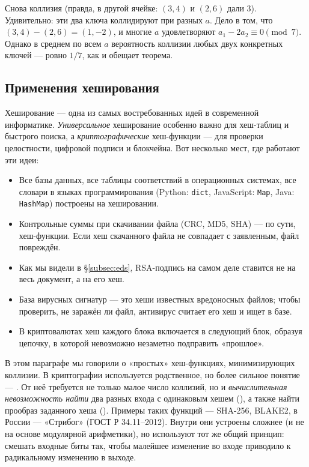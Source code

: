 Снова коллизия (правда, в другой ячейке: $(3,4)$ и $(2,6)$ дали $3$). Удивительно: эти два ключа коллидируют при разных $a$. Дело в том, что $(3, 4) - (2, 6) = (1, -2)$, и многие $a$ удовлетворяют $a_1 - 2 a_2 \equiv 0 \pmod 7$. Однако в среднем по всем $a$ вероятность коллизии любых двух конкретных ключей --- ровно $1/7$, как и обещает теорема.

\subsection{Применения хеширования}

Хеширование --- одна из самых востребованных идей в современной информатике. \emph{Универсальное} хеширование особенно важно для хеш-таблиц и быстрого поиска, а \emph{криптографические} хеш-функции --- для проверки целостности, цифровой подписи и блокчейна. Вот несколько мест, где работают эти идеи:

\begin{itemize}
  \item {} Все базы данных, все таблицы соответствий в операционных системах, все словари в языках программирования (Python: \texttt{dict}, JavaScript: \texttt{Map}, Java: \texttt{HashMap}) построены на хешировании.
  \item {} Контрольные суммы при скачивании файла (CRC, MD5, SHA) --- по сути, хеш-функции. Если хеш скачанного файла не совпадает с заявленным, файл повреждён.
  \item {} Как мы видели в §\ref{subsec:eds}, RSA-подпись на самом деле ставится не на весь документ, а на его хеш.
  \item {} База вирусных сигнатур --- это хеши известных вредоносных файлов; чтобы проверить, не заражён ли файл, антивирус считает его хеш и ищет в базе.
  \item {} В криптовалютах хеш каждого блока включается в следующий блок, образуя цепочку, в которой невозможно незаметно подправить «прошлое».
\end{itemize}

\begin{interestbox}[title={Это интересно: криптографические хеш-функции}]
В этом параграфе мы говорили о «простых» хеш-функциях, минимизирующих коллизии. В криптографии используется родственное, но более сильное понятие --- . От неё требуется не только малое число коллизий, но и \emph{вычислительная невозможность найти} два разных входа с одинаковым хешем (), а также найти прообраз заданного хеша (). Примеры таких функций --- SHA-256, BLAKE2, в России --- «Стрибог» (ГОСТ Р 34.11--2012). Внутри они устроены сложнее (и не на основе модулярной арифметики), но используют тот же общий принцип: смешать входные биты так, чтобы малейшее изменение во входе приводило к радикальному изменению в выходе.
\end{interestbox}

